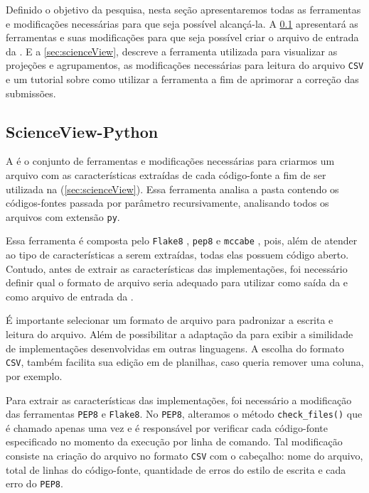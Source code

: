 		Definido o objetivo da pesquisa, nesta seção apresentaremos todas as ferramentas
		e modificações necessárias para que seja possível alcançá-la. A \cref{sec:scienceView-Python}
		apresentará as ferramentas e suas modificações para que seja possível criar
		o arquivo de entrada da . E a \cref{sec:scienceView}, descreve a
		ferramenta utilizada para visualizar as projeções e agrupamentos, as
		modificações necessárias para leitura do arquivo \texttt{CSV} e um tutorial
		sobre como utilizar a ferramenta a fim de aprimorar a correção das submissões.
		

		\subsection{ScienceView-Python}
		\label{sec:scienceView-Python}
			A  é o conjunto de ferramentas e modificações
			necessárias para criarmos um arquivo com as características extraídas de
			cada código-fonte a fim de ser utilizada na  (\cref{sec:scienceView}).
			Essa ferramenta analisa a pasta contendo os códigos-fontes passada por
			parâmetro recursivamente, analisando todos os arquivos com extensão
			\texttt{py}.
			
			Essa ferramenta é composta pelo \texttt{Flake8} \cite{flake8}, \texttt{pep8}
			\cite{pep8} e \texttt{mccabe} \cite{mccabe2013}, pois, além de atender ao tipo
			de características a serem extraídas, todas elas possuem código aberto. Contudo,
			antes de extrair as características das implementações, foi necessário definir
			qual o formato de arquivo seria adequado para utilizar como saída da
			 e como arquivo de entrada da .

			É importante selecionar um formato de arquivo para padronizar a escrita
			e leitura do arquivo. Além de possibilitar a adaptação da 
			para exibir a similidade de implementações desenvolvidas em outras linguagens.
			A escolha do formato \texttt{CSV}, também facilita sua edição em 
			de planilhas, caso queria remover uma coluna, por exemplo.
			
			Para extrair as características das implementações, foi necessário a modificação
			das ferramentas \texttt{PEP8} e \texttt{Flake8}. No \texttt{PEP8}, alteramos o
			método \texttt{check\_files()} que é chamado apenas uma vez e é responsável por
			verificar cada código-fonte especificado no momento da execução por linha de
			comando. Tal modificação consiste na criação do arquivo no formato \texttt{CSV}
			com o cabeçalho: nome do arquivo, total de linhas do código-fonte, quantidade
			de erros do estilo de escrita e cada erro do \texttt{PEP8}.
			
